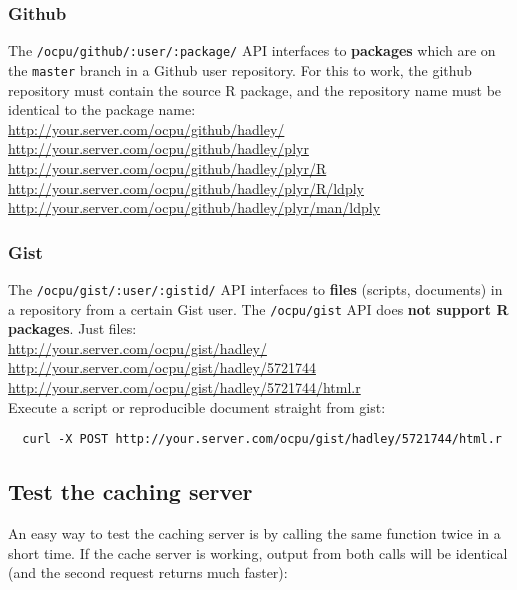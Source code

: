 \documentclass{scrartcl}\usepackage[]{graphicx}\usepackage[]{color}
\begin{document}
\subsubsection*{Github}

The \texttt{/ocpu/github/:user/:package/} API interfaces to \textbf{packages} which are on the \texttt{master} branch in a Github user repository. For this to work, the github repository must contain the source R package, and the repository name must be identical to the package name: \\

\indent \url{http://your.server.com/ocpu/github/hadley/} \\
\indent \url{http://your.server.com/ocpu/github/hadley/plyr} \\
\indent \url{http://your.server.com/ocpu/github/hadley/plyr/R} \\
\indent \url{http://your.server.com/ocpu/github/hadley/plyr/R/ldply} \\
\indent \url{http://your.server.com/ocpu/github/hadley/plyr/man/ldply} 

\subsubsection*{Gist}

The \texttt{/ocpu/gist/:user/:gistid/} API interfaces to \textbf{files} (scripts, documents) in a repository from a certain Gist user. The \texttt{/ocpu/gist} API does \textbf{not support R packages}. Just files: \\

\indent \url{http://your.server.com/ocpu/gist/hadley/} \\
\indent \url{http://your.server.com/ocpu/gist/hadley/5721744} \\
\indent \url{http://your.server.com/ocpu/gist/hadley/5721744/html.r} \\

\noindent Execute a script or reproducible document straight from gist:

\begin{verbatim}
  curl -X POST http://your.server.com/ocpu/gist/hadley/5721744/html.r
\end{verbatim}


\subsection{Test the caching server}

An easy way to test the caching server is by calling the same function twice in a short time. If the cache server is working, output from both calls will be identical (and the second request returns much faster):
\end{document}
